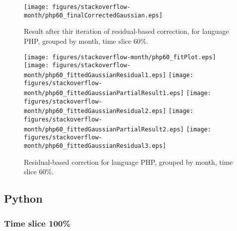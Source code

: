 \begin{figure}[]
\centering
{\texttt{[image: figures/stackoverflow-month/php60\_finalCorrectedGaussian.eps]}}
\caption{Result after thir iteration of residual-based correction, for language PHP, grouped by month, time slice 60\%.}
\end{figure}


\begin{figure}[hb]
\centering
{}
{\texttt{[image: figures/stackoverflow-month/php60\_fitPlot.eps]}}
{\texttt{[image: figures/stackoverflow-month/php60\_fittedGaussianResidual1.eps]}}
{\texttt{[image: figures/stackoverflow-month/php60\_fittedGaussianPartialResult1.eps]}}
{\texttt{[image: figures/stackoverflow-month/php60\_fittedGaussianResidual2.eps]}}
{\texttt{[image: figures/stackoverflow-month/php60\_fittedGaussianPartialResult2.eps]}}
{\texttt{[image: figures/stackoverflow-month/php60\_fittedGaussianResidual3.eps]}}
\caption{Residual-based corretion for language PHP, grouped by month, time slice 60\%.}
\end{figure}


\clearpage 
\newpage 


\subsection{Python}

\FloatBarrier

\subsubsection{Time slice 100\%}

